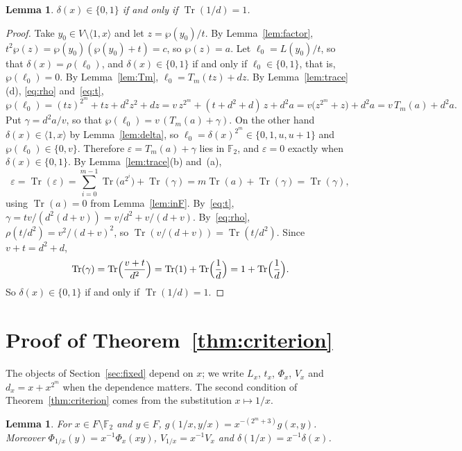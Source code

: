 \documentclass[11pt]{amsart}
\newtheorem{lemma}[theorem]{Lemma}
\theoremstyle{definition}
\theoremstyle{remark}
\numberwithin{equation}{section}
\newcommand{\F}{\mathbb{F}}
\newcommand{\Tr}{\operatorname{Tr}}
\begin{document}
\begin{lemma}\label{lem:first}
$\delta(x)\in\{0,1\}$ if and only if $\Tr(1/d)=1$.
\end{lemma}

\begin{proof}
Take $y_0\in V\setminus\langle1,x\rangle$ and let $z=\wp(y_0)/t$. By Lemma~\ref{lem:factor}, $t^2\wp(z)=\wp(y_0)(\wp(y_0)+t)=c$, so $\wp(z)=a$. Let $\ell_0=L(y_0)/t$, so that $\delta(x)=\rho(\ell_0)$, and $\delta(x)\in\{0,1\}$ if and only if $\ell_0\in\{0,1\}$, that is, $\wp(\ell_0)=0$. By Lemma~\ref{lem:Tm}, $\ell_0=T_m(tz)+dz$. By Lemma~\ref{lem:trace}(d), \eqref{eq:rho} and~\eqref{eq:t},
\[
\wp(\ell_0)=(tz)^{2^m}+tz+d^2z^2+dz=v\,z^{2^m}+(t+d^2+d)\,z+d^2a=v\bigl(z^{2^m}+z\bigr)+d^2a=v\,T_m(a)+d^2a .
\]
Put $\gamma=d^2a/v$, so that $\wp(\ell_0)=v\,(T_m(a)+\gamma)$. On the other hand $\delta(x)\in\langle1,x\rangle$ by Lemma~\ref{lem:delta}, so $\ell_0=\delta(x)^{2^m}\in\{0,1,u,u+1\}$ and $\wp(\ell_0)\in\{0,v\}$. Therefore $\varepsilon=T_m(a)+\gamma$ lies in $\F_2$, and $\varepsilon=0$ exactly when $\delta(x)\in\{0,1\}$. By Lemma~\ref{lem:trace}(b) and~(a),
\[
\varepsilon=\Tr(\varepsilon)=\sum_{i=0}^{m-1}\Tr\bigl(a^{2^i}\bigr)+\Tr(\gamma)=m\Tr(a)+\Tr(\gamma)=\Tr(\gamma),
\]
using $\Tr(a)=0$ from Lemma~\ref{lem:inF}. By~\eqref{eq:t}, $\gamma=tv/(d^2(d+v))=v/d^2+v/(d+v)$. By~\eqref{eq:rho}, $\rho(t/d^2)=v^2/(d+v)^2$, so $\Tr(v/(d+v))=\Tr(t/d^2)$. Since $v+t=d^2+d$,
\[
\Tr(\gamma)=\Tr\Bigl(\frac{v+t}{d^2}\Bigr)=\Tr(1)+\Tr\Bigl(\frac1d\Bigr)=1+\Tr\Bigl(\frac1d\Bigr).
\]
So $\delta(x)\in\{0,1\}$ if and only if $\Tr(1/d)=1$.
\end{proof}

\section{Proof of Theorem~\ref{thm:criterion}}\label{sec:criterion}

The objects of Section~\ref{sec:fixed} depend on $x$; we write $L_x$, $t_x$, $\Phi_x$, $V_x$ and $d_x=x+x^{2^m}$ when the dependence matters. The second condition of Theorem~\ref{thm:criterion} comes from the substitution $x\mapsto 1/x$.

\begin{lemma}\label{lem:inverse}
For $x\in F\setminus\F_2$ and $y\in F$, $g(1/x,y/x)=x^{-(2^m+3)}g(x,y)$. Moreover $\Phi_{1/x}(y)=x^{-1}\Phi_x(xy)$, $V_{1/x}=x^{-1}V_x$ and $\delta(1/x)=x^{-1}\delta(x)$.
\end{lemma}
\end{document}
